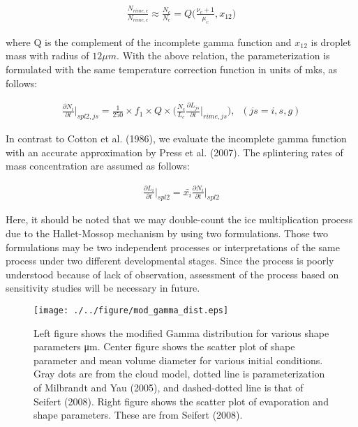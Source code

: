 \begin{eqnarray}
\frac{N_{rime,c}}{N_{rime,c}}\approx\frac{N_{c}}{N_{c}}=Q\bigl(\frac{\nu_{c}+1}{\mu_{c}},x_{12}\bigr)\label{sn215}
\end{eqnarray}

where Q is the complement of the incomplete gamma function and $x_{12}$ is droplet mass with radius of $12 \mu m$. With the above relation, the parameterization is formulated with the same temperature correction function in units of mks, as follows:

\begin{eqnarray}
\frac{\partial N_{i}}{\partial t}\Bigr|_{spl2,js}=\frac{1}{250}\times f_{1}\times Q\times\bigl(\frac{N_{c}}{L_{c}}\frac{\partial L_{js}}{\partial t}\Bigr|_{rime,js}\bigr),\;\;(js=i,s,g)\label{sn216}
\end{eqnarray}

In contrast to Cotton et al. (1986), we evaluate the incomplete gamma function with an accurate approximation by Press et al. (2007). The splintering rates of mass concentration are assumed as follows:

\begin{eqnarray}
\frac{\partial L_{i}}{\partial t}\Bigr|_{spl2} = \bar{x_{i}}\frac{\partial N_{i}}{\partial t}\Bigr|_{spl2}\label{sn217}
\end{eqnarray}

Here, it should be noted that we may double-count the ice multiplication process due to the Hallet-Mossop mechanism by using two formulations. Those two formulations may be two independent processes or interpretations of the same process under two different developmental stages. Since the process is poorly understood because of lack of observation, assessment of the process based on sensitivity studies will be necessary in future.

\begin{figure}[htpb]
\begin{center}
\texttt{[image: ./../figure/mod\_gamma\_dist.eps]}
\end{center}
\caption{Left figure shows the modified Gamma distribution for various shape parameters μm. Center figure shows the scatter plot of shape parameter and mean volume diameter for various initial conditions. Gray dots are from the cloud model, dotted line is parameterization of Milbrandt and Yau (2005), and dashed-dotted line is that of Seifert (2008). Right figure shows the scatter plot of evaporation and shape parameters. These are from Seifert (2008).}
\label{figsn2-17}
\end{figure}


